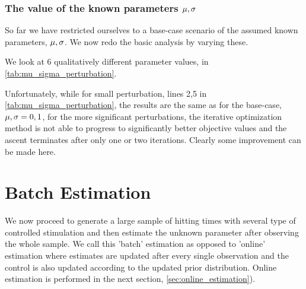 \documentclass{article}
\begin{document}
\subsubsection{The value of the known parameters $\mu, {\sigma }$}
So far we have restricted ourselves to a base-case scenario of the assumed known
parameters, $\mu, {\sigma }$. We now redo the basic analysis by varying these.

We look at 6 qualitatively different parameter values, in
\cref{tab:mu_sigma_perturbation}.

Unfortunately, while for small perturbation, lines 2,5 in
\cref{tab:mu_sigma_perturbation}, the results are the same as for the base-case,
${\mu },{\sigma } = 0,1$, for the more significant perturbations, the iterative
 optimization method is not able to progress to significantly better objective
 values and the ascent terminates after only one or two iterations. Clearly some 
improvement can be made here.

\clearpage

\section{Batch Estimation}
\label{sec:batch_estimation}
We now proceed to generate a large sample of hitting times with several type
of controlled stimulation and then estimate the unknown
parameter after observing the whole sample. We call this 'batch' estimation as opposed to
'online' estimation where estimates are updated after every single observation
and the control is also updated according to the updated prior distribution.
Online estimation is performed in the next
section, \cref{sec:online_estimation}).
\end{document}
